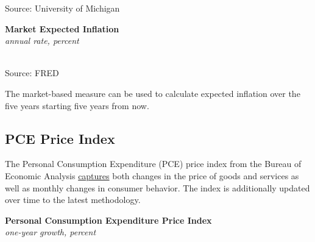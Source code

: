 \documentclass{report}
\makeatletter
\newcommand{\tbllink}[1]{\href{https://raw.githubusercontent.com/bdecon/US-chartbook/master/chartbook/data/#1}{\faTable}}
\newcommand*\short[1]{\expandafter\@gobbletwo\number\numexpr#1\relax}
\newcommand{\absnode}[3]{\node[below right, align=left] at (axis cs: #1,#2) {#3};}
\newcommand{\ltdateaxisticks}{
		date coordinates in=x, axis line style={draw=none},
		xmax={2023-02-15},
		max space between ticks=40,	    
		xtick={{2013-01-01}, {2014-01-01}, {2015-01-01}, {2016-01-01}, {2017-01-01}, {2018-01-01}, 
		    {2019-01-01}, {2020-01-01}, {2021-01-01}, {2022-01-01}, {2023-01-01}},
		enlarge y limits={0.06}, enlarge x limits={0.01},
		}
\newcommand{\bbar}[2]{extra #1 ticks = {{#2}}, extra #1 tick labels = ,
		extra #1 tick style = {grid=major, grid style={thick, black!25}},}
\newcommand{\thinline}[4]{\addplot[no markers, color=#1] 
		table [x=#2, y=#3, col sep=comma] {#4};	}
\newcommand{\rbar}{
		\fill[color=black!10] (axis cs:{2020-02-01},\pgfkeysvalueof{/pgfplots/ymin}) rectangle 
			(axis cs:{2020-05-01}, \pgfkeysvalueof{/pgfplots/ymax});}
\makeatother
\begin{document}
{\begin{minipage}{0.76\textwidth}
\footnotesize{Source: University of Michigan} \hfill \tbllink{infumichlt.csv}
\end{minipage}
\vspace{1mm}

\begin{minipage}{0.47\textwidth}
\normalsize \textbf{Market Expected Inflation}\\
\footnotesize{\textit{annual rate, percent}}\\
\hspace*{-2mm} \\
\footnotesize{Source: FRED} \hfill \tbllink{infbreak_comb.csv}
\end{minipage} \hspace{6mm} 
\begin{minipage}{0.24\textwidth}
\small The market-based measure can be used to calculate expected inflation over the five years starting five years from now. 
\end{minipage}
\newpage
\hypertarget{prpce}{}
\begin{minipage}{0.76\textwidth}
\subsection*{PCE Price Index}
\small The Personal Consumption Expenditure (PCE) price index from the Bureau of Economic Analysis \href{https://www.bea.gov/data/personal-consumption-expenditures-price-index}{captures} both changes in the price of goods and services as well as monthly changes in consumer behavior. The index is additionally updated over time to the latest methodology. 


\vspace{1mm}

\normalsize \textbf{Personal Consumption Expenditure Price Index}\\
\footnotesize{\textit{one-year growth, percent}}\\
\vspace{35mm}


\end{minipage}}
\end{document}
